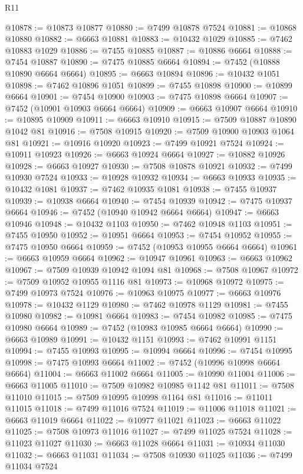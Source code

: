\begin{lexlean}{R11}
\begin{coremodule}
@10878 := @10873 @10877
@10880 := @7499 @10878 @7524
@10881 := @10868 @10880
@10882 := @6663 @10881
@10883 := @10432 @1029
@10885 := @7462 @10883 @1029
@10886 := @7455 @10885
@10887 := @10886 @6664
@10888 := @7454 @10887
@10890 := @7475 @10885 @6664
@10894 := @7452 (@10888 @10890 @6664 @6664)
@10895 := @6663 @10894
@10896 := @10432 @1051
@10898 := @7462 @10896 @1051
@10899 := @7455 @10898
@10900 := @10899 @6664
@10901 := @7454 @10900
@10903 := @7475 @10898 @6664
@10907 := @7452 (@10901 @10903 @6664 @6664)
@10909 := @6663 @10907 @6664
@10910 := @10895 @10909
@10911 := @6663 @10910
@10915 := @7509 @10887 @10890 @1042 @81
@10916 := @7508 @10915
@10920 := @7509 @10900 @10903 @1064 @81
@10921 := @10916 @10920
@10923 := @7499 @10921 @7524
@10924 := @10911 @10923
@10926 := @6663 @10924 @6664
@10927 := @10882 @10926
@10928 := @6663 @10927
@10930 := @7508 @10878 @10921
@10932 := @7499 @10930 @7524
@10933 := @10928 @10932
@10934 := @6663 @10933
@10935 := @10432 @1081
@10937 := @7462 @10935 @1081
@10938 := @7455 @10937
@10939 := @10938 @6664
@10940 := @7454 @10939
@10942 := @7475 @10937 @6664
@10946 := @7452 (@10940 @10942 @6664 @6664)
@10947 := @6663 @10946
@10948 := @10432 @1103
@10950 := @7462 @10948 @1103
@10951 := @7455 @10950
@10952 := @10951 @6664
@10953 := @7454 @10952
@10955 := @7475 @10950 @6664
@10959 := @7452 (@10953 @10955 @6664 @6664)
@10961 := @6663 @10959 @6664
@10962 := @10947 @10961
@10963 := @6663 @10962
@10967 := @7509 @10939 @10942 @1094 @81
@10968 := @7508 @10967
@10972 := @7509 @10952 @10955 @1116 @81
@10973 := @10968 @10972
@10975 := @7499 @10973 @7524
@10976 := @10963 @10975
@10977 := @6663 @10976
@10978 := @10432 @1129
@10980 := @7462 @10978 @1129
@10981 := @7455 @10980
@10982 := @10981 @6664
@10983 := @7454 @10982
@10985 := @7475 @10980 @6664
@10989 := @7452 (@10983 @10985 @6664 @6664)
@10990 := @6663 @10989
@10991 := @10432 @1151
@10993 := @7462 @10991 @1151
@10994 := @7455 @10993
@10995 := @10994 @6664
@10996 := @7454 @10995
@10998 := @7475 @10993 @6664
@11002 := @7452 (@10996 @10998 @6664 @6664)
@11004 := @6663 @11002 @6664
@11005 := @10990 @11004
@11006 := @6663 @11005
@11010 := @7509 @10982 @10985 @1142 @81
@11011 := @7508 @11010
@11015 := @7509 @10995 @10998 @1164 @81
@11016 := @11011 @11015
@11018 := @7499 @11016 @7524
@11019 := @11006 @11018
@11021 := @6663 @11019 @6664
@11022 := @10977 @11021
@11023 := @6663 @11022
@11025 := @7508 @10973 @11016
@11027 := @7499 @11025 @7524
@11028 := @11023 @11027
@11030 := @6663 @11028 @6664
@11031 := @10934 @11030
@11032 := @6663 @11031
@11034 := @7508 @10930 @11025
@11036 := @7499 @11034 @7524

\end{coremodule}
\end{lexlean}
